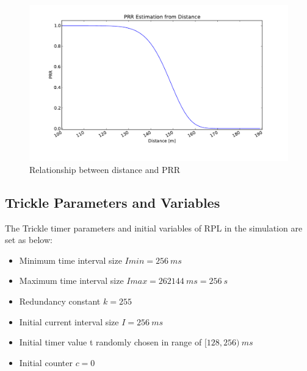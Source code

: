 \begin{figure}[htbp]
  \begin{center}
    \leavevmode
      \includegraphics[scale=0.45]{Pics/prr.pdf}
   \caption{Relationship between distance and PRR}
    \label{fig:prr}
  \end{center}
\end{figure}

\subsection{Trickle Parameters and Variables}
\label{trickle parameters}
The Trickle timer parameters and initial variables of RPL in the simulation are set as below:
\begin{itemize}
\item Minimum time interval size $Imin = 256\:ms$

\item Maximum time interval size $Imax = 262144\:ms = 256\:s$

\item Redundancy constant $k = 255$

\item Initial current interval size $I = 256\:ms$

\item Initial timer value t randomly chosen in range of $[128, 256)\:ms$

\item Initial counter $c=0$
\end{itemize}

